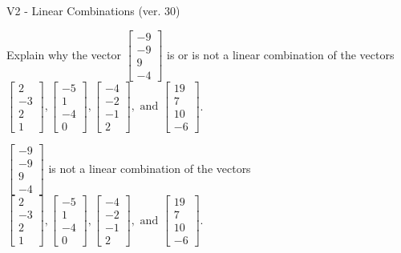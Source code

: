 \begin{exercise}
  \begin{exerciseTitle}V2 - Linear Combinations (ver. 30)\end{exerciseTitle}
  \begin{exerciseStatement}
    Explain why the vector \(\left[\begin{array}{c}
-9 \\
-9 \\
9 \\
-4
\end{array}\right]\)  is or is not a linear 
	combination of the vectors \(\left[\begin{array}{c}
2 \\
-3 \\
2 \\
1
\end{array}\right] , \left[\begin{array}{c}
-5 \\
1 \\
-4 \\
0
\end{array}\right] , \left[\begin{array}{c}
-4 \\
-2 \\
-1 \\
2
\end{array}\right] , \text{ and } \left[\begin{array}{c}
19 \\
7 \\
10 \\
-6
\end{array}\right]\).
	


  \end{exerciseStatement}
  \begin{exerciseAnswer}
   \(\left[\begin{array}{c}
-9 \\
-9 \\
9 \\
-4
\end{array}\right]\) 
  	 is not  
	a linear combination of the vectors \(\left[\begin{array}{c}
2 \\
-3 \\
2 \\
1
\end{array}\right] , \left[\begin{array}{c}
-5 \\
1 \\
-4 \\
0
\end{array}\right] , \left[\begin{array}{c}
-4 \\
-2 \\
-1 \\
2
\end{array}\right] , \text{ and } \left[\begin{array}{c}
19 \\
7 \\
10 \\
-6
\end{array}\right]\).


\end{exerciseAnswer}
\end{exercise}
